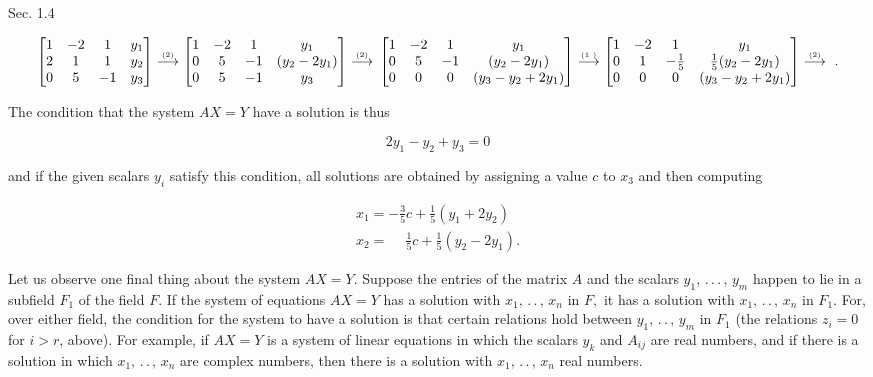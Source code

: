 Sec. 1.4

\[\begin{bmatrix}1&-2&1&y_{1}\\ 2&1&1&y_{2}\\ 0&5&-1&y_{3}\end{bmatrix}\stackrel{{\text{\tiny(2)}}}{{\longrightarrow}} \begin{bmatrix}1&-2&1&y_{1}\\ 0&5&-1&(y_{2}-2y_{1})\\ 0&5&-1&y_{3}\end{bmatrix}\stackrel{{\text{\tiny(2)}}}{{ \longrightarrow}}\\ \begin{bmatrix}1&-2&1&y_{1}\\ 0&5&-1&(y_{2}-2y_{1})\\ 0&0&0&(y_{3}-y_{2}+2y_{1})\end{bmatrix}\stackrel{{\text{\tiny(1 )}}}{{\longrightarrow}}\begin{bmatrix}1&-2&1&y_{1}\\ 0&1&-\frac{1}{5}&\frac{1}{5}(y_{2}-2y_{1})\\ 0&0&0&(y_{3}-y_{2}+2y_{1})\end{bmatrix}\stackrel{{\text{\tiny(2)}} }{{\longrightarrow}}\ .\]

The condition that the system \(AX=Y\) have a solution is thus

\[2y_{1}-y_{2}+y_{3}=0\]

and if the given scalars \(y_{i}\) satisfy this condition, all solutions are obtained by assigning a value \(c\) to \(x_{3}\) and then computing

\[\begin{array}{l}x_{1}=-\frac{3}{5}c+\frac{1}{5}(y_{1}+2y_{2})\\ x_{2}=\phantom{-}\frac{1}{5}c+\frac{1}{5}(y_{2}-2y_{1}).\end{array}\]

Let us observe one final thing about the system \(AX=Y.\) Suppose the entries of the matrix \(A\) and the scalars \(y_{1},\,.\,.\,.\,,\,y_{m}\) happen to lie in a subfield \(F_{1}\) of the field \(F.\) If the system of equations \(AX=Y\) has a solution with \(x_{1},\,.\,.\,,\,x_{n}\) in \(F,\) it has a solution with \(x_{1},\,.\,.\,,\,x_{n}\) in \(F_{1}.\) For, over either field, the condition for the system to have a solution is that certain relations hold between \(y_{1},\,.\,.\,,\,y_{m}\) in \(F_{1}\) (the relations \(z_{i}=0\) for \(i>r\), above). For example, if \(AX=Y\) is a system of linear equations in which the scalars \(y_{k}\) and \(A_{ij}\) are real numbers, and if there is a solution in which \(x_{1},\,.\,.\,,\,x_{n}\) are complex numbers, then there is a solution with \(x_{1},\,.\,.\,,\,x_{n}\) real numbers.

